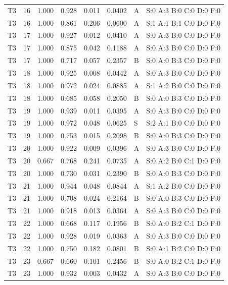 \begin{longtable}{lrrrrrll}
T3 & 16 & 1.000 & 0.928 & 0.011 & 0.0402 & A & \tiny S:0 A:3 B:0 C:0 D:0 F:0 \\
T3 & 16 & 1.000 & 0.861 & 0.206 & 0.0600 & A & \tiny S:1 A:1 B:1 C:0 D:0 F:0 \\
T3 & 17 & 1.000 & 0.927 & 0.012 & 0.0410 & A & \tiny S:0 A:3 B:0 C:0 D:0 F:0 \\
T3 & 17 & 1.000 & 0.875 & 0.042 & 0.1188 & A & \tiny S:0 A:3 B:0 C:0 D:0 F:0 \\
T3 & 17 & 1.000 & 0.717 & 0.057 & 0.2357 & B & \tiny S:0 A:0 B:3 C:0 D:0 F:0 \\
T3 & 18 & 1.000 & 0.925 & 0.008 & 0.0442 & A & \tiny S:0 A:3 B:0 C:0 D:0 F:0 \\
T3 & 18 & 1.000 & 0.972 & 0.024 & 0.0885 & A & \tiny S:1 A:2 B:0 C:0 D:0 F:0 \\
T3 & 18 & 1.000 & 0.685 & 0.058 & 0.2050 & B & \tiny S:0 A:0 B:3 C:0 D:0 F:0 \\
T3 & 19 & 1.000 & 0.939 & 0.011 & 0.0395 & A & \tiny S:0 A:3 B:0 C:0 D:0 F:0 \\
T3 & 19 & 1.000 & 0.972 & 0.048 & 0.0625 & S & \tiny S:2 A:1 B:0 C:0 D:0 F:0 \\
T3 & 19 & 1.000 & 0.753 & 0.015 & 0.2098 & B & \tiny S:0 A:0 B:3 C:0 D:0 F:0 \\
T3 & 20 & 1.000 & 0.922 & 0.009 & 0.0396 & A & \tiny S:0 A:3 B:0 C:0 D:0 F:0 \\
T3 & 20 & 0.667 & 0.768 & 0.241 & 0.0735 & A & \tiny S:0 A:2 B:0 C:1 D:0 F:0 \\
T3 & 20 & 1.000 & 0.730 & 0.031 & 0.2390 & B & \tiny S:0 A:0 B:3 C:0 D:0 F:0 \\
T3 & 21 & 1.000 & 0.944 & 0.048 & 0.0844 & A & \tiny S:1 A:2 B:0 C:0 D:0 F:0 \\
T3 & 21 & 1.000 & 0.708 & 0.024 & 0.2164 & B & \tiny S:0 A:0 B:3 C:0 D:0 F:0 \\
T3 & 21 & 1.000 & 0.918 & 0.013 & 0.0364 & A & \tiny S:0 A:3 B:0 C:0 D:0 F:0 \\
T3 & 22 & 1.000 & 0.668 & 0.117 & 0.1956 & B & \tiny S:0 A:0 B:2 C:1 D:0 F:0 \\
T3 & 22 & 1.000 & 0.928 & 0.019 & 0.0363 & A & \tiny S:0 A:3 B:0 C:0 D:0 F:0 \\
T3 & 22 & 1.000 & 0.750 & 0.182 & 0.0801 & B & \tiny S:0 A:1 B:2 C:0 D:0 F:0 \\
T3 & 23 & 0.667 & 0.660 & 0.101 & 0.2456 & B & \tiny S:0 A:0 B:2 C:1 D:0 F:0 \\
T3 & 23 & 1.000 & 0.932 & 0.003 & 0.0432 & A & \tiny S:0 A:3 B:0 C:0 D:0 F:0 \\

\end{longtable}

